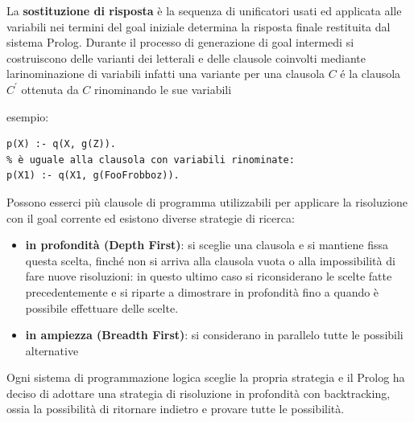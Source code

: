 La \textbf{sostituzione di risposta} è la sequenza di unificatori usati ed applicata alle variabili nei termini del goal iniziale
determina la risposta finale restituita dal sistema Prolog.\newline
Durante il processo di generazione di goal intermedi si costruiscono delle varianti dei letterali e delle clausole coinvolti
mediante larinominazione di variabili infatti una variante per una clausola $C$ é la clausola $C^{'}$ ottenuta da $C$ rinominando le sue variabili
\begin{esempio}
esempio:
\begin{verbatim}
p(X) :- q(X, g(Z)).
% è uguale alla clausola con variabili rinominate:
p(X1) :- q(X1, g(FooFrobboz)).
\end{verbatim}
\end{esempio}
Possono esserci più clausole di programma utilizzabili per applicare la risoluzione con il goal corrente ed esistono diverse strategie di ricerca:
\begin{itemize}
\item \textbf{in profondità (Depth First)}: si sceglie una clausola e si mantiene fissa questa scelta, finché non si arriva alla clausola vuota
  o alla impossibilità di fare nuove risoluzioni: in questo ultimo caso si riconsiderano le scelte fatte precedentemente e si riparte a dimostrare
  in profondità fino a quando è possibile effettuare delle scelte.
\item \textbf{in ampiezza (Breadth First)}: si considerano in parallelo tutte le possibili alternative
\end{itemize}
Ogni sistema di programmazione logica sceglie la propria strategia e il Prolog ha deciso di adottare una strategia di risoluzione
in profondità con backtracking, ossia la possibilità di ritornare indietro e provare tutte le possibilità.

